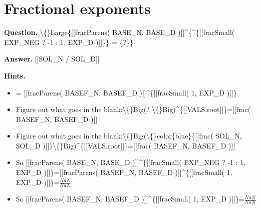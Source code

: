 \documentclass{article}
\begin{document}
\section*{Fractional exponents}
\textbf{Question.} \textbackslash\{\}Large\{[[fracParens( BASE\_N, BASE\_D )]]\textasciicircum{}\{\textasciicircum{}\{[[fracSmall( EXP\_NEG ? -1 : 1, EXP\_D )]]\}\} = \{?\}\}

\textbf{Answer.} [[SOL\_N / SOL\_D]]

\textbf{Hints.}
\begin{itemize}
  \item = [[fracParens( BASEF\_N, BASEF\_D )]]\textasciicircum{}\{[[fracSmall( 1, EXP\_D )]]\}
  \item Figure out what goes in the blank:\textbackslash\{\}Big(? \textbackslash\{\}Big)\textasciicircum{}\{[[VALS.root]]\}=[[frac( BASEF\_N, BASEF\_D )]]
  \item Figure out what goes in the blank:\textbackslash\{\}Big(\textbackslash\{\}color\{blue\}\{[[frac( SOL\_N, SOL\_D )]]\}\textbackslash\{\}Big)\textasciicircum{}\{[[VALS.root]]\}=[[frac( BASEF\_N, BASEF\_D )]]
  \item So [[fracParens( BASE\_N, BASE\_D )]]\textasciicircum{}\{[[fracSmall( EXP\_NEG ? -1 : 1, EXP\_D )]]\}=[[fracParens( BASEF\_N, BASEF\_D )]]\textasciicircum{}\{[[fracSmall( 1, EXP\_D )]]\}=$\frac{NaN}{NaN}$
  \item So [[fracParens( BASEF\_N, BASEF\_D )]]\textasciicircum{}\{[[fracSmall( 1, EXP\_D )]]\}=$\frac{NaN}{NaN}$
\end{itemize}
\end{document}
